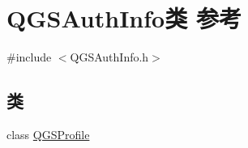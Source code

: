\hypertarget{class_q_g_s_auth_info}{}\section{Q\+G\+S\+Auth\+Info类 参考}
\label{class_q_g_s_auth_info}


{\ttfamily \#include $<$Q\+G\+S\+Auth\+Info.\+h$>$}

\subsection*{类}
\begin{DoxyCompactItemize}
\item 
class \mbox{\hyperlink{class_q_g_s_auth_info_1_1_q_g_s_profile}{Q\+G\+S\+Profile}}
\end{DoxyCompactItemize}
